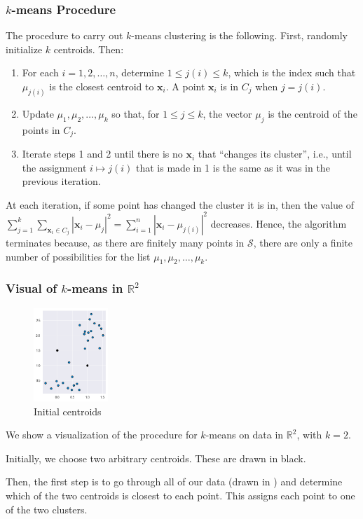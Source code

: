 \documentclass[smaller]{beamer}
\theoremstyle{example}
\newcommand{\x}{\textbf{x}}
\begin{document}
\begin{frame}
    \frametitle{$k$-means Procedure}
    
    The procedure to carry out $k$-means clustering is the following. First, randomly initialize $k$ centroids. Then: 
    \begin{enumerate}
        \item For each $i=1,2,\ldots,n$, determine $1\le j(i)\le k$, which is the index such that $\mu_{j(i)}$ is the closest centroid to $\x_i$. A point $\x_i$ is in $C_j$ when $j=j(i)$.
        \item Update $\mu_1,\mu_2,\ldots,\mu_k$ so that, for $1\le j\le k$, the vector $\mu_j$ is the centroid of the points in $C_j$.
        \item Iterate steps 1 and 2 until there is no $\x_i$ that ``changes its cluster'', i.e., until the assignment $i\mapsto j(i)$ that is made in 1 is the same as it was in the previous iteration.
    \end{enumerate}

    At each iteration, if some point has changed the cluster it is in, then the value of $\sum_{j=1}^k\sum_{\x_i\in C_j} |\x_i - \mu_{j}|^2 = \sum_{i=1}^n|\x_i - \mu_{j(i)}|^2$ decreases. Hence, the algorithm terminates because, as there are finitely many points in $\mathcal S$, there are only a finite number of possibilities for the list $\mu_1, \mu_2, \ldots, \mu_k$.
\end{frame}

\begin{frame}
    \frametitle{Visual of $k$-means in $\mathbb R^2$}
    
    \begin{figure}
        \begin{center}
            \includegraphics[width=0.25\textwidth]{../../Images/kmeans_0.png}
        \end{center}
        \caption{Initial centroids}
    \end{figure}

    We show a visualization of the procedure for $k$-means on data in $\mathbb R^2$, with $k=2$.
    \vspace*{12pt}

    Initially, we choose two arbitrary centroids. These are drawn in black.

    Then, the first step is to go through all of our data (drawn in ) and determine which of the two centroids is closest to each point. This assigns each point to one of the two clusters.

\vfill
\end{frame}
\end{document}

